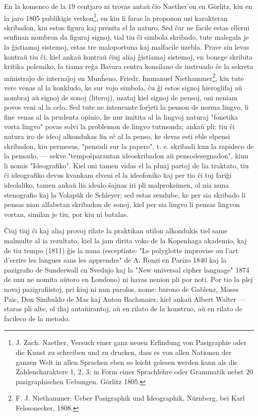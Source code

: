    En la komenco de la 19 centjaro ni trovas anta\u u \^cio Naether'on en
Görlitz, kiu en la jaro 1805 publikigis verkon\footnote{J. Zach. Naether,
Versuch einer ganz neuen Erfindung von
Pasigraphie oder die Kunst zu schreiben und zu drucken, dass es von
allen Nationen der ganzen Welt in allen Sprachen eben so leicht
gelesen werden kann als die Zahlencharaktere 1, 2, 3; in Form einer
Sprachlehre oder Grammatik nebst 20 pasigraphischen Uebungen.
Görlitz 1805.}, en kiu li faras la
proponon uzi karakteran skribadon, kiu estus figura kaj prenita el
la naturo. Sed \^car ne facile estas ellerni senfinan nombron da
figuraj signoj, tial tiu \^ci simbola skribado, tute malegala je la
\^gistiamaj sistemoj, estas tre maloportuna kaj malfacile uzebla.
Prave sin levas kontra\u u tiu \^ci, kiel anka\u u kontra\u u \^ciuj
aliaj \^gistiamaj sistemoj, en bonege skribita kritika polemiko, la
tiama re\^ga Bavara centra konsilano de instruado \^ce la sekreta
ministra\^{\j}o de interna\^{\j}oj en Mun\^heno, Friedr. Immanuel
Niethammer\footnote{F. J. Niethammer: Ueber Pasigraphik und
Ideographik, Nürnberg, bei Karl Felssonecker, 1808.}, kiu tute vere
venas al la konkludo, ke sur vojo simbola, \^cu \^gi estos signoj
hieroglifaj a\u u nombraj a\u u signoj de sonoj (literoj), uzataj
kiel signoj de pensoj, oni neniam povos veni al la celo. Sed tute ne
intencante for\^{\j}eti la penson de norma lingvo, li fine venas al
la prudenta opinio, ke nur imitita al la lingvoj naturaj "fonetika
vorta lingvo" povas solvi la problemon de lingvo tutmonda; anka\u u
pli: tiu \^ci natura iro de ideoj alkondukas lin e\^c al la penso,
ke devas esti eble elpensi skribadon, kiu permesus, "pensadi sur la
papero", t. e. skribadi kun la rapideco de la pensado, --- sekve
"tempo\^sparantan ideoskribadon a\u u pensodesegnadon", kiun li
nomis "Ideografiko". Kiel oni tamen vidas el la pluaj partoj de
lia traktato, tiu \^ci ideografiko devus kvankam elveni el la
ideofoniko kaj per tio \^ci tuj fari\^gi ideolaliko, tamen anka\u u
lia idealo \^sajnas iri pli malproksimen, ol nia nuna stenografio
kaj la Volap\"uk de Schleyer; sed estas sendube, ke per sia skribado
li pensas nian alfabetan skribadon de sonoj, kiel per sia lingvo li
pensas lingvon vortan, similan je tiu, por kiu ni batalas.

   \^Ciuj tiuj \^ci kaj aliaj provoj rilate la praktikan utilon alkondukis
tiel same malmulte al ia rezultato, kiel la jam dirita voko de la
Kopenhaga akademio, kaj de tiu tempo (1811) \^gis la nuna
(esceptinte: "Le polyglotte improvise ou l'art d'ecrire les langues
sans les apprendre" de A. Renzi en Parizo 1840 kaj la pazigrafio de
Sunderwall en Svedujo kaj la "New universal cipher language" 1874
de unu ne nomita a\u utoro en Londono) ni havas nenion pli por noti.
Por tio la plej novaj pazigrafiistoj, pri kiuj ni nun parolos, nome:
barono de Gablenz, Moses Paic, Don Sinibaldo de Mas kaj Anton
Bachmaier, kiel anka\u u Albert Walter --- staras pli alte, ol iliaj
anta\u uirantoj, a\u u en rilato de la konstruo, a\u u en rilato de
facileco de la metodo.

